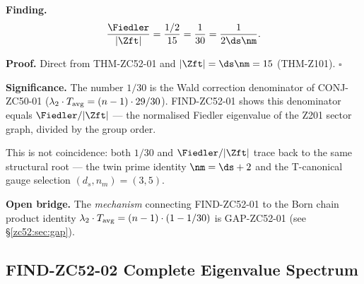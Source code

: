\documentclass[12pt, a4paper]{article}
\begin{document}
\begin{derivedbox}[title={FIND-ZC52-01: $\text{Fiedler}/|\Zft| =
  1/(2d_s n_m) = 1/30$ (Exact, $R_0$)}]
\textbf{Finding.}
\begin{equation}\label{zc52:eq:fiedler-ratio}
  \frac{\Fiedler}{|\Zft|}
  = \frac{1/2}{15}
  = \frac{1}{30}
  = \frac{1}{2\ds\nm}.
\end{equation}

\textbf{Proof.} Direct from THM-ZC52-01 and $|\Zft|=\ds\nm=15$
(THM-Z101). \hfill$\square$

\textbf{Significance.}
The number $1/30$ is the Wald correction denominator of
CONJ-ZC50-01 ($\lambda_2\cdot T_{\rm avg} = (n-1)\cdot 29/30$).
FIND-ZC52-01 shows this denominator equals
$\Fiedler/|\Zft|$ --- the normalised Fiedler eigenvalue of
the Z201 sector graph, divided by the group order.

This is not coincidence: both $1/30$ and $\Fiedler/|\Zft|$
trace back to the same structural root ---
the twin prime identity $\nm=\ds+2$ and the T-canonical
gauge selection $(d_s,n_m)=(3,5)$.

\textbf{Open bridge.}
The \emph{mechanism} connecting FIND-ZC52-01 to the Born chain
product identity $\lambda_2\cdot T_{\rm avg}=(n-1)\cdot(1-1/30)$
is GAP-ZC52-01 (see \S\ref{zc52:sec:gap}).
\end{derivedbox}

\subsection{FIND-ZC52-02 \quad Complete Eigenvalue Spectrum}
\end{document}
